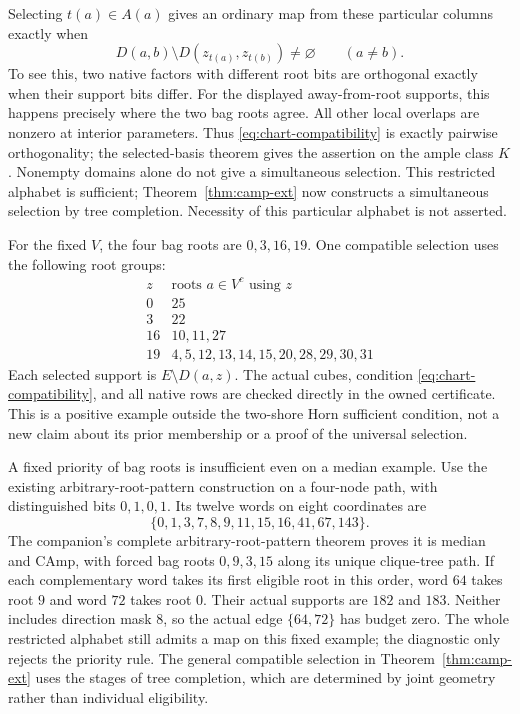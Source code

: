 \documentclass[11pt]{article}
\theoremstyle{definition}
\begin{document}
Selecting $t(a)\in A(a)$ gives an ordinary map from these particular
columns exactly when
\begin{equation}\label{eq:chart-compatibility}
 D(a,b)\setminus D(z_{t(a)},z_{t(b)})\ne\varnothing\qquad(a\ne b).
\end{equation}
To see this, two native factors with different root bits are orthogonal
exactly when their support bits differ. For the displayed away-from-root
supports, this happens precisely where the two bag roots agree. All other
local overlaps are nonzero at interior parameters. Thus
\eqref{eq:chart-compatibility} is exactly pairwise orthogonality; the
selected-basis theorem gives the assertion on the ample class $K$.
Nonempty domains alone do not give a simultaneous selection. This
restricted alphabet is sufficient; Theorem~\ref{thm:camp-ext} now
constructs a simultaneous selection by tree completion. Necessity of
this particular alphabet is not asserted.

For the fixed $V$, the four bag roots are $0,3,16,19$.
One compatible selection uses the following root groups:
\[
\begin{array}{c|l}
 z&\text{roots }a\in V^c\text{ using }z\\\hline
0&25\\
3&22\\
16&10,11,27\\
19&4,5,12,13,14,15,20,28,29,30,31
\end{array}
\]
Each selected support is $E\setminus D(a,z)$.
The actual cubes, condition \eqref{eq:chart-compatibility}, and all native
rows are checked directly in the owned certificate. This is a positive
example outside the two-shore Horn sufficient condition, not a new claim
about its prior membership or a proof of the universal selection.

A fixed priority of bag roots is insufficient even on a median example.
Use the existing arbitrary-root-pattern construction on a four-node path,
with distinguished bits $0,1,0,1$. Its twelve words on eight coordinates are
\[
 \{0,1,3,7,8,9,11,15,16,41,67,143\}.
\]
The companion's complete arbitrary-root-pattern theorem proves it is median
and CAmp, with forced bag roots $0,9,3,15$ along its unique clique-tree path.
If each complementary word takes its first eligible root in this order,
word $64$ takes root $9$ and word $72$ takes root $0$.
Their actual supports are $182$ and $183$. Neither includes direction
mask $8$, so the actual edge $\{64,72\}$ has budget zero.
The whole restricted alphabet still admits a map on this fixed example;
the diagnostic only rejects the priority rule. The general compatible
selection in Theorem~\ref{thm:camp-ext} uses the stages of tree completion,
which are determined by joint geometry rather than individual eligibility.
\end{document}
